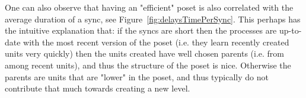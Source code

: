 \documentclass[a4paper,10pt]{article}
\begin{document}
				One can also observe that having an "efficient" poset is also correlated with the average duration of a sync, see Figure~\ref{fig:delaysTimePerSync}.
				This perhaps has the intuitive explanation that: if the syncs are short then the processes are up-to-date with the most recent version of the poset (i.e. they learn recently created units very quickly) then the units created have well chosen parents (i.e. from among recent units), and thus the structure of the poset is nice.
				Otherwise the parents are units that are "lower" in the poset, and thus typically do not contribute that much towards creating a new level.
\end{document}

